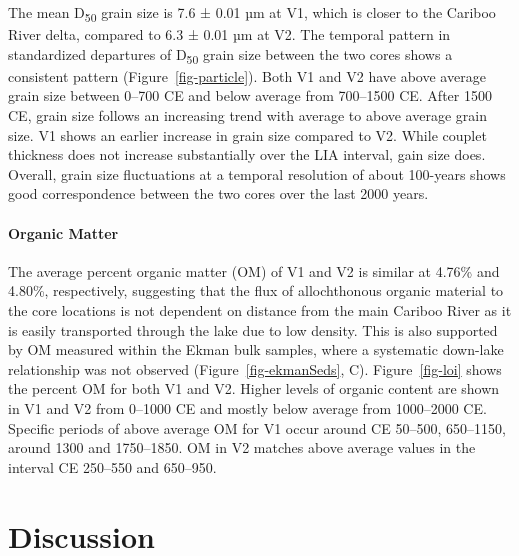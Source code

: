 \documentclass[
  letterpaper,
  DIV=11,
  numbers=noendperiod]{scrartcl}
\let\oldparagraph\paragraph
\renewcommand{\paragraph}[1]{\oldparagraph{#1}\mbox{}}
\begin{document}
The mean D\textsubscript{50} grain size is 7.6 ± 0.01 µm at V1, which is
closer to the Cariboo River delta, compared to 6.3 ± 0.01 µm at V2. The
temporal pattern in standardized departures of D\textsubscript{50} grain
size between the two cores shows a consistent pattern
(Figure~\ref{fig-particle}). Both V1 and V2 have above average grain
size between 0--700 CE and below average from 700--1500 CE. After 1500
CE, grain size follows an increasing trend with average to above average
grain size. V1 shows an earlier increase in grain size compared to V2.
While couplet thickness does not increase substantially over the LIA
interval, gain size does. Overall, grain size fluctuations at a temporal
resolution of about 100-years shows good correspondence between the two
cores over the last 2000 years.

\hypertarget{organic-matter}{%
\paragraph{Organic Matter}\label{organic-matter}}

The average percent organic matter (OM) of V1 and V2 is similar at
4.76\% and 4.80\%, respectively, suggesting that the flux of
allochthonous organic material to the core locations is not dependent on
distance from the main Cariboo River as it is easily transported through
the lake due to low density. This is also supported by OM measured
within the Ekman bulk samples, where a systematic down-lake relationship
was not observed (Figure~\ref{fig-ekmanSeds}, C). Figure~\ref{fig-loi}
shows the percent OM for both V1 and V2. Higher levels of organic
content are shown in V1 and V2 from 0--1000 CE and mostly below average
from 1000--2000 CE. Specific periods of above average OM for V1 occur
around CE 50--500, 650--1150, around 1300 and 1750--1850. OM in V2
matches above average values in the interval CE 250--550 and 650--950.

\hypertarget{discussion}{%
\section{Discussion}\label{discussion}}
\end{document}
